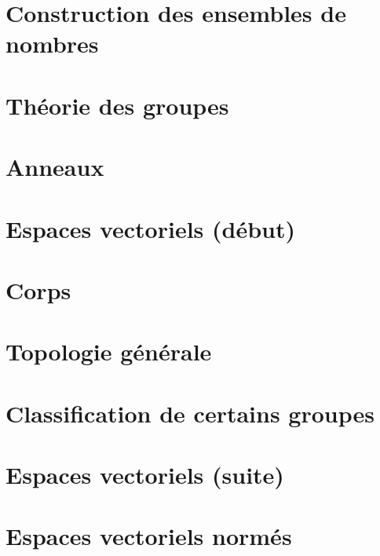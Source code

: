\documentclass[a4paper,twoside,11pt]{book}
\begin{document}
\chapter{Construction des ensembles de nombres}


\chapter{Théorie des groupes}



\chapter{Anneaux}



\chapter{Espaces vectoriels (début)}


\chapter{Corps}




\chapter{Topologie générale}




\chapter{Classification de certains groupes}


\chapter{Espaces vectoriels (suite)}








\chapter{Espaces vectoriels normés}


\end{document}
